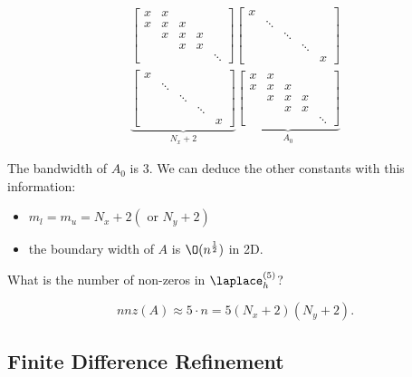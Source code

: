 \begin{align*}
\begin{bmatrix}
	x & x &   &   & \\
	x & x & x &   & \\
	  & x & x & x & \\
	  &   & x & x & \\
	  &   &   &   & \ddots
\end{bmatrix}
\begin{bmatrix}
	x &   &   &   & \\
	  & \ddots &   &   & \\
	  &   & \ddots &   & \\
	  &   &   & \ddots & \\
	  &   &   &   & x
\end{bmatrix} \\
\underbrace{ 
\begin{bmatrix}
	x &   &   &   & \\
	  & \ddots &   &   & \\
	  &   & \ddots &   & \\
	  &   &   & \ddots & \\
	  &   &   &   & x
\end{bmatrix}}_{N_{x}+2}
\underbrace{ 
\begin{bmatrix}
	x & x &   &   & \\
	x & x & x &   & \\
	  & x & x & x & \\
	  &   & x & x & \\
	  &   &   &   & \ddots
\end{bmatrix}}_{A_0}
\end{align*}

The bandwidth of $A_0$ is 3.
We can deduce the other constants with this information:
\begin{itemize}
	\item $m_{l}=m_{u}=N_{x}+2 (\text{ or } N_{y}+2)$
	\item the boundary width of $A$ is $\O(n^{\frac{1}{2}})$ in 2D.
\end{itemize}

What is the number of non-zeros in $\laplace_{h}^{(5)} $?

\[
	nnz(A) \approx 5 \cdot n = 5(N_{x} +2)(N_{y} +2)
.\] 

\subsection{Finite Difference Refinement}%
\label{sec:Finite Difference Refinement}

